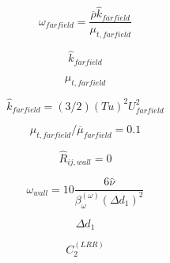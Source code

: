 {\newpage\clearpage
{}%
\begin{displaymath}
\omega_{farfield} = \frac{\overline \rho \hat k_{farfield}}{\mu_{t, farfield}}
\end{displaymath}%
\lthtmldisplayZ
\lthtmlcheckvsize\clearpage}

{\newpage\clearpage
{}%
\begin{displaymath}
\hat k_{farfield}
\end{displaymath}%
\lthtmldisplayZ
\lthtmlcheckvsize\clearpage}

{\newpage\clearpage
{}%
\begin{displaymath}
\mu_{t, farfield}
\end{displaymath}%
\lthtmldisplayZ
\lthtmlcheckvsize\clearpage}

{\newpage\clearpage
{}%
\begin{displaymath}
\hat k_{farfield} = (3/2) (Tu)^2 U_{farfield}^2
\end{displaymath}%
\lthtmldisplayZ
\lthtmlcheckvsize\clearpage}

{\newpage\clearpage
{}%
\begin{displaymath}
\mu_{t, farfield}/\overline \mu_{farfield} = 0.1
\end{displaymath}%
\lthtmldisplayZ
\lthtmlcheckvsize\clearpage}

{\newpage\clearpage
{}%
\begin{displaymath}
\hat R_{ij, wall} = 0
\end{displaymath}%
\lthtmldisplayZ
\lthtmlcheckvsize\clearpage}

{\newpage\clearpage
{}%
\begin{displaymath}
\omega_{wall} = 10 \frac{6 \hat \nu}{\beta_{\omega}^{(\omega)} (\Delta d_1)^2}
\end{displaymath}%
\lthtmldisplayZ
\lthtmlcheckvsize\clearpage}

{\newpage\clearpage
{}%
\begin{displaymath}
\Delta d_1
\end{displaymath}%
\lthtmldisplayZ
\lthtmlcheckvsize\clearpage}

{\newpage\clearpage
{}%
\begin{displaymath}
C_2^{(LRR)}
\end{displaymath}%
\lthtmldisplayZ
\lthtmlcheckvsize\clearpage}

